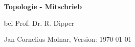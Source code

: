 \documentclass[paper=a5,parskip=half,fleqn,DIV=calc]{scrartcl}
\theoremstyle{graymarginwithblueheader}
\theoremstyle{graymarginwithyellowheader}
\theoremstyle{graymarginwithitblackheader}
\theoremstyle{graymarginwithblueheadern}
\theoremstyle{graymarginwithyellowheadern}
\theoremstyle{graymarginwithitblackheadern}
\begin{document}
\begin{center}
{\huge\bf Topologie - Mitschrieb}

bei Prof. Dr. R. Dipper

Jan-Cornelius Molnar, Version: \today\ \thistime
\end{center}

\tableofcontents

\newpage


\newpage


\newpage


\newpage


\newpage

\end{document}
